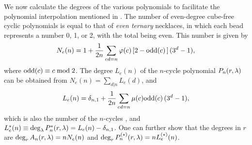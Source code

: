 \documentclass{ws-ijbc}
\begin{document}
We now calculate the degrees of the various polynomials
  to facilitate the polynomial interpolation
  mentioned in .
The number of even-degree cube-free cyclic polynomials
is equal to that of \emph{even ternary} necklaces,
in which each bead represents a number 0, 1, or 2,
  with the total being even.
This number is given by
%
\begin{equation}
  N_e(n) = 1 +
    \frac{1}{2n} \sum_{c d = n} \varphi(c)
    \left[ 2 - \mathrm{odd}(c) \, \right]
    (3^d-1),
\notag
\end{equation}
where
$\mathrm{odd}(c) \equiv c \bmod 2$.
%
%
%
%
The degree $L_e(n)$ of the $n$-cycle polynomial $P_n(r, \lambda)$
  can be obtained from
  $N_e(n) = \sum_{d|n} L_e(d)$,
and
%
%
\begin{equation}
  L_e(n) = \delta_{n, 1} +
    \frac{1}{2n} \sum_{cd = n} \mu(c) \mathrm{odd}(c) \, (3^d-1),
\notag
\end{equation}
%
%
%
which is also the number of the $n$-cycles \cite{zeng},
%
and
  $L^*_e(n) \equiv \deg_\lambda P^*_n(r, \lambda) = L_e(n) - \delta_{n,1}$.
%
%
%
One can further show that the degrees in $r$ are
  $\deg_r A_n(r, \lambda) = n N_e(n)$
  and
  $\deg_r P^{(*)}_n(r, \lambda) = n L^{(*)}_e(n)$.
\end{document}
